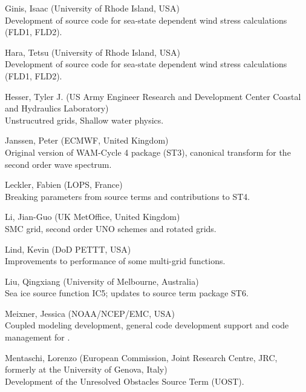 \begin{list}{\ldots}{ }
\item [Ginis, Isaac] (University of Rhode Island, USA) \\
  Development of source code for sea-state dependent wind stress calculations (FLD1, FLD2).

\item [Hara, Tetsu] (University of Rhode Island, USA) \\
  Development of source code for sea-state dependent wind stress calculations (FLD1, FLD2).

\item [Hesser, Tyler J.] (US Army Engineer Research and Development Center Coastal and Hydraulics Laboratory) \\
 Unstrucutred grids, Shallow water physics.

\item [Janssen, Peter] (ECMWF, United Kingdom) \\
  Original version of WAM-Cycle 4 package (ST3), canonical transform for the second order wave spectrum.

\item [Leckler, Fabien] (LOPS, France) \\
  Breaking parameters from source terms and contributions to ST4.

\item [Li, Jian-Guo] (UK MetOffice, United Kingdom) \\
  SMC grid, second order UNO schemes and rotated grids.

\item [Lind, Kevin]  (DoD PETTT, USA)\\ 
  Improvements to performance of some multi-grid functions.
 
\item [Liu, Qingxiang] (University of Melbourne, Australia)\\
  Sea ice source function IC5; updates to source term package ST6.

\item [Meixner, Jessica] (NOAA/NCEP/EMC, USA) \\
  Coupled modeling development, general code development support and code management for \ws.
 
\item [Mentaschi, Lorenzo]  (European Commission, Joint Research Centre, JRC,
  formerly at the University of Genova, Italy)\\ 
  Development of the Unresolved Obstacles Source Term (UOST).
 

\end{list}

